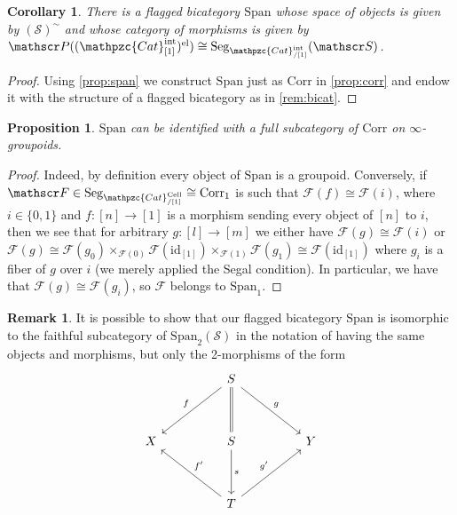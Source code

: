 \documentclass[a4paper, reqno]{amsart}
\newtheorem{prop}[theorem]{Proposition}
\newtheorem{cor}[theorem]{Corollary}
\theoremstyle{definition}
\newtheorem{remark}[theorem]{Remark}
\newcommand\cF{\mathscr F}
\newcommand\cP{\mathscr P}
\newcommand\cS{\mathscr S}
\newcommand\id{\mathrm{id}}
\newcommand\ccat{\mathpzc{Cat}}
\newcommand\spanc{\mathrm{Span}}
\newcommand\corr{\mathrm{Corr}}
\newcommand\cell{\mathrm{Cell}}
\newcommand\inrt{\mathrm{int}}
\newcommand\el{\mathrm{el}}
\newcommand\seg{\mathrm{Seg}}
\begin{document}
\begin{cor}\label{cor:span}
There is a flagged bicategory $\spanc$ whose space of objects is given by $(\cS)^\sim$ and whose category of morphisms is given by $\cP((\ccat^\inrt_{[1]})^\el)\cong \seg_{\ccat^\inrt_{/[1]}}(\cS)$.
\end{cor}
\begin{proof}
Using \cref{prop:span} we construct $\spanc$ just as $\corr$ in \cref{prop:corr} and endow it with the structure of a flagged bicategory as in \cref{rem:bicat}.
\end{proof}
\begin{prop}\label{prop:span_subcat}
$\spanc$ can be identified with a full subcategory of $\corr$ on $\infty$-groupoids.
\end{prop}
\begin{proof}
Indeed, by definition every object of $\spanc$ is a groupoid. Conversely, if $\cF\in\seg_{\ccat^\cell_{/[1]}}\cong \corr_1$ is such that $\cF(f)\cong\cF(i)$, where $i\in\{0,1\}$ and $f:[n]\rightarrow[1]$ is a morphism sending every object of $[n]$ to $i$, then we see that for arbitrary $g:[l]\rightarrow[m]$ we either have $\cF(g)\cong \cF(i)$ or $\cF(g)\cong\cF(g_0)\times_{\cF(0)}\cF(\id_{[1]})\times_{\cF(1)}\cF(g_1)\cong \cF(\id_{[1]})$ where $g_i$ is a fiber of $g$ over $i$ (we merely applied the Segal condition). In particular, we have that $\cF(g)\cong \cF(g_i)$, so $\cF$ belongs to $\spanc_1$.
\end{proof}
\begin{remark}
It is possible to show that our flagged bicategory $\spanc$ is isomorphic to the faithful subcategory of $\spanc_2(\cS)$ in the notation of \cite{haugseng2018iterated} having the same objects and morphisms, but only the 2-morphisms of the form 
\[
\begin{tikzcd}[row sep=huge, column sep=huge]
{}&S\arrow[dl, "f" swap]\arrow[dr, "g"]\arrow[d, equal]\\
X&S\arrow[d, "s"]&Y\\
{}&T\arrow[ul, "f'" swap]\arrow[ur, "g'"]
\end{tikzcd}
\]
\end{remark}
\end{document}
